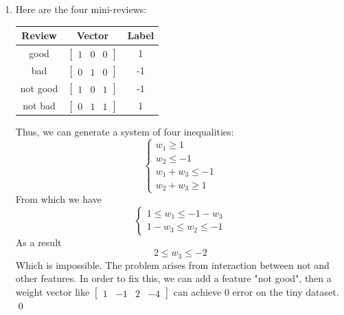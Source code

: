 \documentclass[12pt]{article}
\begin{document}
\begin{enumerate}[label=(\alph*)]
  \item
    Here are the four mini-reviews:\\
    \begin{center}
    \begin{tabular}{||c|c|c||}
      \hline
        Review & Vector & Label \\
      \hline
      \hline
        good & 
        $\begin{bmatrix}
            1 & 0 & 0
        \end{bmatrix}$
        & 1 \\
      \hline
        bad & 
        $\begin{bmatrix}
            0 & 1 & 0
        \end{bmatrix}$
        & -1 \\
      \hline
        not good & 
        $\begin{bmatrix}
            1 & 0 & 1
        \end{bmatrix}$
        & -1 \\
      \hline
        not bad & 
        $\begin{bmatrix}
            0 & 1 & 1
        \end{bmatrix}$
        & 1 \\
      \hline
    \end{tabular}
    \end{center}
    Thus, we can generate a system of four inequalities:
    \begin{equation}
      \begin{cases}
        w_1 \ge 1 \\
        w_2 \le -1 \\
        w_1 + w_3 \le -1 \\
        w_2 + w_3 \ge 1
      \end{cases}
    \end{equation}
    From which we have\\
      \begin{equation}
        \begin{cases}
          1 \le w_1 \le -1 - w_3 \\
          1 - w_3 \le w_2 \le -1    
        \end{cases}
      \end{equation}
    As a result
      \begin{equation}
        2 \le w_3 \le -2
      \end{equation}
    Which is impossible. The problem arises from interaction between not and other features. In order to fix this, we can add a feature "not good", then a weight vector like $
      \begin{bmatrix}
            1 & -1 & 2 & -4
      \end{bmatrix}$
    can achieve 0 error on the tiny dataset. \qed
    
\end{enumerate}
\end{document}
